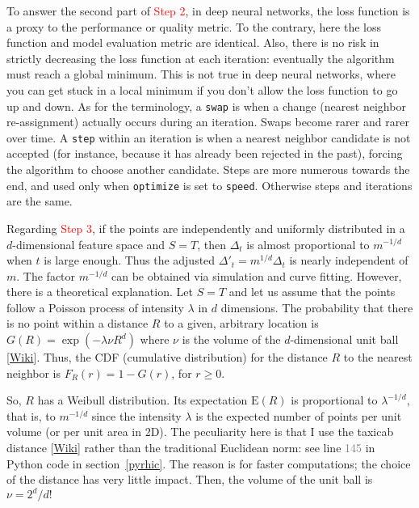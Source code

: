 \documentclass[oneside,10pt]{book}
\begin{document}
\noindent To answer the second part of \textcolor{red}{Step 2}, in deep neural networks, the loss function is a proxy to the performance or quality metric.
To the contrary, here the loss function and model evaluation metric are identical. Also, there is no risk in strictly decreasing the loss function at each iteration: eventually the algorithm must reach a global minimum. This is not true in deep neural networks, where you can get stuck in a local minimum if you don't allow the loss function to go up and down.   As for the terminology, a \texttt{swap} is when a change (nearest neighbor re-assignment) actually occurs during an iteration. Swaps become rarer and rarer over time. A \texttt{step} within an iteration is when a nearest neighbor candidate is not accepted (for instance, because it has already been rejected in the past), forcing the
 algorithm to choose another candidate. Steps are more numerous towards the end, and used only when \texttt{optimize} is set to \texttt{\textquotesingle speed\textquotesingle}. Otherwise steps
 and iterations are the same. 

Regarding \textcolor{red}{Step 3}, if the points are independently and uniformly distributed in a $d$-dimensional feature space and $S = T$, then $\Delta_t$ is
 almost proportional to $m^{-1/d}$ when $t$ is large enough. Thus the adjusted $\Delta'_t = m^{1/d}\Delta_t$ is nearly independent of $m$. The
 factor $m^{-1/d}$ can be obtained via simulation and curve fitting. However, there is a theoretical explanation.  Let $S = T$ and let us assume that the points follow 
 a \textcolor{index}{Poisson process} of intensity $\lambda$ in $d$ dimensions. The probability that there is no point within a distance $R$ to
 a given, arbitrary location is $G(R) =\exp(-\lambda \nu R^d)$ where $\nu$ is the volume of the $d$-dimensional \textcolor{index}{unit ball} 
[\href{https://en.wikipedia.org/wiki/Volume_of_an_n-ball}{Wiki}].  Thus, the CDF (cumulative distribution) for the distance $R$ to the
 nearest neighbor is $F_R(r) = 1 - G(r)$, for $r\geq 0$. 

So, $R$ has a \textcolor{index}{Weibull distribution}. Its expectation $\text{E}(R)$ is proportional to
 $\lambda^{-1/d}$, that is, to $m^{-1/d}$ since the intensity $\lambda$ is the expected number of points per unit volume (or per unit area in 2D).
The peculiarity here is that I use the 
\textcolor{index}{taxicab distance} [\href{https://en.wikipedia.org/wiki/Taxicab_geometry}{Wiki}] 
rather than the traditional Euclidean norm: see line \textcolor{gray}{145} in Python code in section~\ref{pyrhic}. The reason is for faster computations; the choice of the distance has very little impact. Then, the volume of the unit ball is $\nu=2^d / d!$
\end{document}
